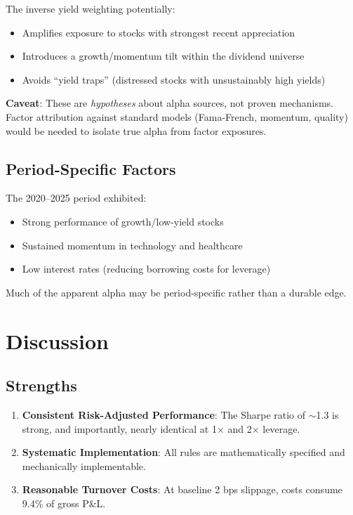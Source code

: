 \documentclass[12pt,a4paper]{article}
\theoremstyle{definition}
\begin{document}
The inverse yield weighting potentially:
\begin{itemize}
    \item Amplifies exposure to stocks with strongest recent appreciation
    \item Introduces a growth/momentum tilt within the dividend universe
    \item Avoids ``yield traps'' (distressed stocks with unsustainably high yields)
\end{itemize}

\textbf{Caveat}: These are \textit{hypotheses} about alpha sources, not proven mechanisms. Factor attribution against standard models (Fama-French, momentum, quality) would be needed to isolate true alpha from factor exposures.

\subsection{Period-Specific Factors}

The 2020--2025 period exhibited:
\begin{itemize}
    \item Strong performance of growth/low-yield stocks
    \item Sustained momentum in technology and healthcare
    \item Low interest rates (reducing borrowing costs for leverage)
\end{itemize}

Much of the apparent alpha may be period-specific rather than a durable edge.

\section{Discussion}
\label{sec:discussion}

\subsection{Strengths}

\begin{enumerate}
    \item \textbf{Consistent Risk-Adjusted Performance}: The Sharpe ratio of $\sim$1.3 is strong, and importantly, nearly identical at 1$\times$ and 2$\times$ leverage.

    \item \textbf{Systematic Implementation}: All rules are mathematically specified and mechanically implementable.

    \item \textbf{Reasonable Turnover Costs}: At baseline 2 bps slippage, costs consume 9.4\% of gross P\&L.
\end{enumerate}
\end{document}
